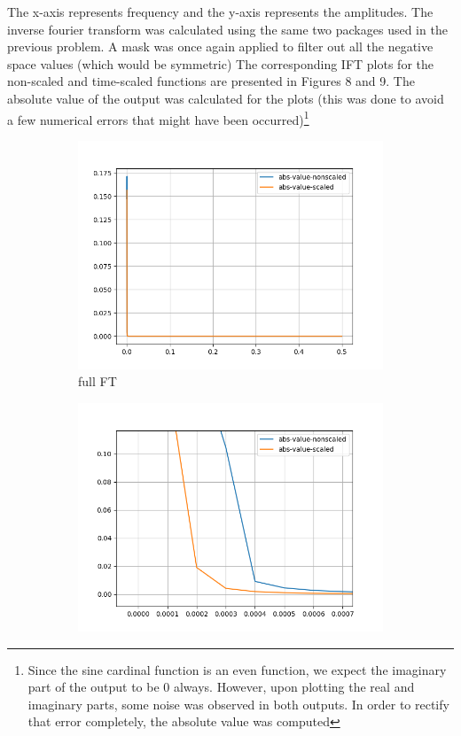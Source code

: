 \documentclass[12pt]{article}
\begin{document}
The x-axis represents frequency and the y-axis represents the amplitudes. The inverse fourier transform was calculated using the same two packages used in the previous problem. A mask was once again applied to filter out all the negative space values (which would be symmetric) The corresponding IFT plots for the non-scaled and time-scaled functions are presented in Figures 8 and 9. The absolute value of the output was calculated for the plots (this was done to avoid a few numerical errors that might have been occurred)\footnote{Since the sine cardinal function is an even function, we expect the imaginary part of the output to be $0$ always. However, upon plotting the real and imaginary parts, some noise was observed in both outputs. In order to rectify that error completely, the absolute value was computed}
\begin{figure}[h]
	\centering
	\begin{subfigure}[h]{0.40\textwidth}
		\centering
		\includegraphics[width=\textwidth]{2/freq_domain_absolute_value_-_np-fft-sinecardinal.png}
		\caption{full FT}
	\end{subfigure}
	\begin{subfigure}[h]{0.40\textwidth}
		\centering
		\includegraphics[width=\textwidth]{2/freq_domain_absolute_value_-_np-fft-sinecardinalzoom.png}

\end{subfigure}
\end{figure}
\end{document}
